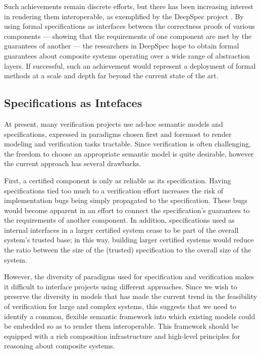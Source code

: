 \documentclass[acmsmall,timestamp,review]{acmart}
\begin{document}
Such achievements remain discrete efforts, but
there has been increasing interest in rendering them interoperable,
as exemplified by the DeepSpec project \cite{deepspec}.
By using formal specifications as interfaces
between the correctness proofs of various components ---
showing that the requirements of one component
are met by the guarantees of another ---
the researchers in DeepSpec hope to
obtain formal guarantees about composite systems
operating over a wide range of abstraction layers.
If successful,
such an achievement would represent a deployment of formal methods
at a scale and depth far beyond the current state of the art.


\subsection{Specifications as Intefaces} %

At present, many verification projects
use ad-hoc semantic models and specifications,
expressed in paradigms chosen first and foremost
to render modeling and verification tasks tractable.
Since verification is often challenging,
the freedom to choose an appropriate semantic model
is quite desirable,
however the current approach has several drawbacks.

First,
a certified component is only as reliable as its specification.
Having specifications tied too much to a verification effort
increases the risk of
implementation bugs being simply propagated to
the specification.
These bugs would become apparent in an effort to
connect the specification's guarantees to
the requirements of another component.
In addition,
specifications used as internal interfaces
in a larger certified system cease to be part of
the overall system's trusted base;
in this way,
building larger certified systems would reduce the
ratio between the size of the (trusted) specification to
the overall size of the system.

However,
the diversity of paradigms used for specification and verification
makes it difficult
to interface projects using different approaches.
Since we wish to preserve the diversity in models
that has made the current trend in
the feasibility of verification for large and complex systems,
this suggests that we need to identify a common,
flexible semantic framework
into which existing models could be embedded
so as to render them interoperable.
This framework should be equipped with
a rich composition infrastructure
and high-level principles for
reasoning about composite systems.
\end{document}
